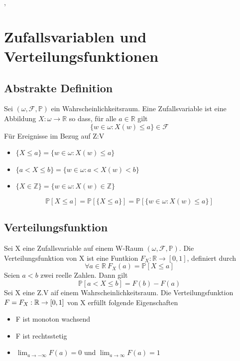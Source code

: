 \sep
\section{Zufallsvariablen und Verteilungsfunktionen}
\subsection{Abstrakte Definition }
\Def[2.1 Zufallsvariable] \newline
Sei \( (\omega, \mathcal{F}, \mathbb{P})\) ein Wahrscheinlichkeitsraum. Eine Zufallsvariable ist eine Abbildung \( X : \omega \rightarrow \mathbb{R} \) so dass, für alle \( a \in \mathbb{R}\) gilt \[ \{ w \in \omega : X(w) \leq a \} \in \mathcal{F}\]
\Bem  \newline
Für Ereignisse im Bezug auf Z:V
\begin{itemize}
    \item \( \{X \leq a \} = \{ w \in \omega : X(w) \leq a\}\)
    \item \( \{ a < X \leq b \} = \{ w \in \omega : a < X(w) < b\}\)
    \item \( \{ X \in \mathbb{Z}\} = \{ w \in \omega : X(w) \in \mathbb{Z}\}\)
\end{itemize}
\[ \mathbb{P}[X \leq a] = \mathbb{P}[\{X \leq a\}] = \mathbb{P}[\{w \in \omega : X(w) \leq a\}]\]
\subsection{Verteilungsfunktion}
\Def[2.2 Verteilungsfunktion] \newline
Sei X eine Zufallsvariable auf einem W-Raum \( (\omega, \mathcal{F}, \mathbb{P})\). Die Verteilungsfunktion von X ist eine Funtkion \(F_X : \mathbb{R} \rightarrow [0,1]\), definiert durch \[ \forall a \in \mathbb{R} \ F_X(a) = \mathbb{P}[X \leq a]\]
 \newline
Seien \(a < b\) zwei reelle Zahlen. Dann gilt \[ \mathbb{P}[a < X \leq b ] = F(b) - F(a)\]
 \newline
Sei X eine Z.V aif einem Wahrscheinlichkeitsraum. Die Verteilungsfunktion \( F = F_X : \mathbb{R} \rightarrow [0,1]\) von X erfüllt folgende Eigenschaften
\begin{itemize}
    \item F ist monoton wachsend
    \item F ist rechtsstetig
    \item \( \lim_{a \rightarrow -\infty} F(a) = 0 \) und \( \lim_{a \rightarrow \infty} F(a) = 1\)
\end{itemize}
